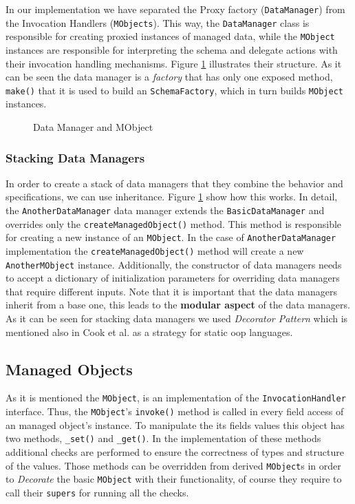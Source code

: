 In our implementation we have separated the Proxy factory (\texttt{DataManager}) from the Invocation Handlers (\texttt{MObjects}).
This way, the \texttt{DataManager} class is responsible for creating proxied instances of managed data, while the \texttt{MObject} instances are responsible for interpreting the schema and delegate actions with their invocation handling mechanisms. 
Figure \ref{fig:DataManager_and_MObject} illustrates their structure.
As it can be seen the data manager is a \textit{factory} that has only one exposed method, \texttt{make()} that it is used to build an \texttt{SchemaFactory}, which in turn builds \texttt{MObject} instances.

\begin{figure}[H]
	\centering
  	\caption{Data Manager and MObject}
  	\label{fig:DataManager_and_MObject}
\end{figure}

\subsubsection{Stacking Data Managers}
In order to create a stack of data managers that they combine the behavior and specifications, we can use inheritance.
Figure \ref{fig:DataManager_and_MObject} show how this works.
In detail, the \texttt{AnotherDataManager} data manager extends the \texttt{BasicDataManager} and overrides only the \texttt{createManagedObject()} method. 
This method is responsible for creating a new instance of an \texttt{MObject}.
In the case of \texttt{AnotherDataManager} implementation the \texttt{createManagedObject()} method will create a new \texttt{AnotherMObject} instance.
Additionally, the constructor of data managers needs to accept a dictionary of initialization parameters for overriding data managers that require different inputs.
Note that it is important that the data managers inherit from a base one, this leads to the \textbf{modular aspect} of the data managers.
As it can be seen for stacking data managers we used \textit{Decorator Pattern} \cite{gamma1995design} which is mentioned also in Cook et al. \cite{loh2012managed} as a strategy for static \ac{oop} languages.


\subsection{Managed Objects}\label{sec:Managed Objects}
As it is mentioned the \texttt{MObject}, is an implementation of the \texttt{InvocationHandler} interface.
Thus, the \texttt{MObject}'s \texttt{invoke()} method is called in every field access of an managed object's instance.
To manipulate the its fields values this object has two methods, \texttt{\_set()} and \texttt{\_get()}.
In the implementation of these methods additional checks are performed to ensure the correctness of types and structure of the values.
Those methods can be overridden from derived \texttt{MObject}s in order to \textit{Decorate} the basic \texttt{MObject} with their functionality, of course they require to call their \texttt{supers} for running all the checks.


